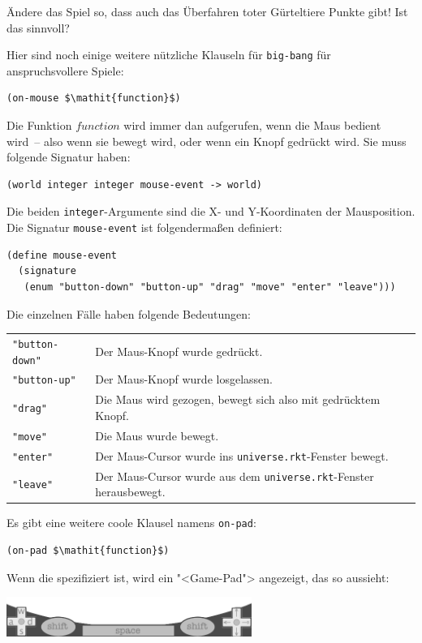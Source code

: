 \begin{aufgabeinline}
  Ändere das Spiel so, dass auch das Überfahren toter Gürteltiere
  Punkte gibt!  Ist das sinnvoll?
\end{aufgabeinline}
%
Hier sind noch einige weitere nützliche Klauseln für
\lstinline{big-bang} für anspruchsvollere Spiele:
%
\begin{lstlisting}
(on-mouse $\mathit{function}$)
\end{lstlisting}
%
Die Funktion $\mathit{function}$ wird immer dan aufgerufen, wenn die
Maus bedient wird~-- also wenn sie bewegt wird, oder wenn ein Knopf
gedrückt wird.  Sie muss folgende Signatur haben:
%
\begin{lstlisting}
(world integer integer mouse-event -> world)
\end{lstlisting}
%
Die beiden \lstinline{integer}-Argumente sind die X- und Y-Koordinaten
der Mausposition.
Die Signatur \lstinline{mouse-event} ist folgendermaßen definiert:
%
\begin{lstlisting}
(define mouse-event
  (signature
   (enum "button-down" "button-up" "drag" "move" "enter" "leave")))
\end{lstlisting}
%
Die einzelnen Fälle haben folgende Bedeutungen:
%
\noindent  \begin{longtable}{lp{4in}}
  \lstinline!"button-down"! & Der Maus-Knopf wurde gedrückt.\\
  \lstinline!"button-up"! & Der Maus-Knopf wurde losgelassen.\\
  \lstinline!"drag"! & Die Maus wird gezogen, bewegt
  sich also mit gedrücktem Knopf.\\
  \lstinline!"move"! & Die Maus wurde bewegt.\\
  \lstinline!"enter"! & Der Maus-Cursor wurde ins
  \texttt{universe.rkt}-Fenster bewegt.\\
  \lstinline!"leave"! & Der Maus-Cursor wurde aus dem
                        \texttt{universe.rkt}-Fenster herausbewegt.
  \end{longtable}
%
\noindent Es gibt eine weitere coole Klausel namens \lstinline{on-pad}:
%
\begin{lstlisting}
(on-pad $\mathit{function}$)
\end{lstlisting}
%
Wenn die spezifiziert ist, wird ein "<Game-Pad"> angezeigt, das so
aussieht:
%
\begin{center}
  \includegraphics[width=0.6\textwidth]{videospiele/gamepad}
\end{center}
